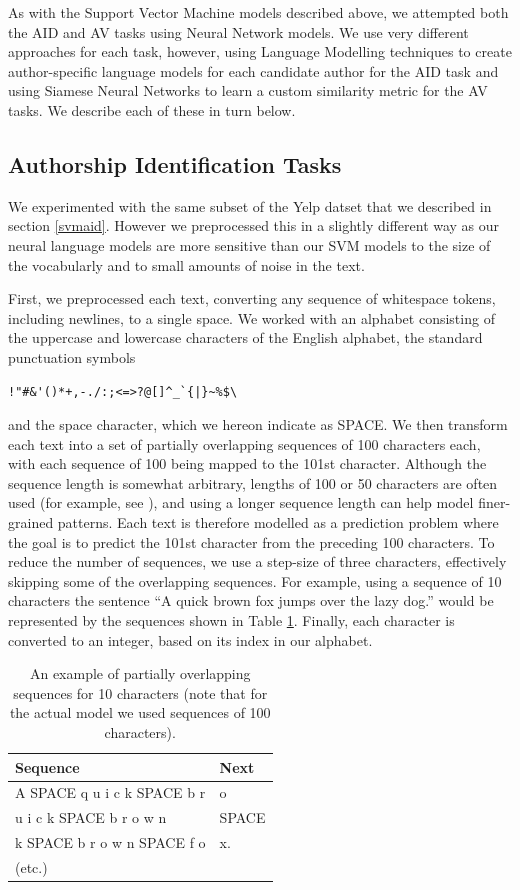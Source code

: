 As with the Support Vector Machine models described above, we attempted both the AID and AV tasks using Neural Network models. We use very different approaches for each task, however, using Language Modelling techniques to create author-specific language models for each candidate author for the AID task and using Siamese Neural Networks to learn a custom similarity metric for the AV tasks. We describe each of these in turn below.

\subsection{Authorship Identification Tasks}
\label{models:nn-aid}
We experimented with the same subset of the Yelp datset that we described in section \ref{svmaid}. However we preprocessed this in a slightly different way as our neural language models are more sensitive than our SVM models to the size of the vocabularly and to small amounts of noise in the text.

First, we preprocessed each text, converting any sequence of whitespace tokens, including newlines, to a single space. We worked with an alphabet consisting of the uppercase and lowercase characters of the English alphabet, the standard punctuation symbols \begin{verbatim}!"#&'()*+,-./:;<=>?@[]^_`{|}~%$\
\end{verbatim} and the space character, which we hereon indicate as SPACE. We then transform each text into a set of partially overlapping sequences of 100 characters each, with each sequence of 100 being mapped to the 101st character. Although the sequence length is somewhat arbitrary, lengths of 100 or 50 characters are often used (for example, see \cite{karpathy2015unreasonable}), and using a longer sequence length can help model finer-grained patterns. Each text is therefore modelled as a prediction problem where the goal is to predict the 101st character from the preceding 100 characters. 
To reduce the number of sequences, we use a step-size of three characters, effectively skipping some of the overlapping sequences. For example, using a sequence of 10 characters the sentence ``A quick brown fox jumps over the lazy dog.'' would be represented by the sequences shown in Table \ref{seq-table}. Finally, each character is converted to an integer, based on its index in our alphabet.

\begin{table}[ht]
\caption{\label{seq-table} An example of partially overlapping sequences for 10 characters (note that for the actual model we used sequences of 100 characters). }
\begin{center}
\begin{tabular}{ll}
\toprule 
\bf Sequence & \bf Next \\
\midrule
A SPACE q u i c k SPACE b r & o \\
u i c k SPACE b r o w n & SPACE \\
k SPACE b r o w n SPACE f o & x.\\
(etc.) & \\
\bottomrule
\end{tabular}
\end{center}
\end{table}

